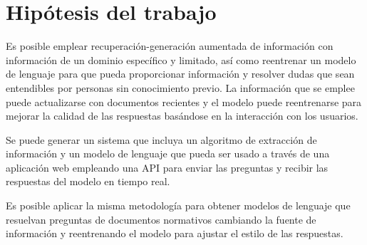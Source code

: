 \section{Hipótesis del trabajo}

Es posible emplear recuperación-generación aumentada de información con información
de un dominio específico y limitado, así como reentrenar un modelo de lenguaje
para que pueda proporcionar información y resolver dudas que sean entendibles
por personas sin conocimiento previo. La información que se emplee puede
actualizarse con documentos recientes y el modelo puede reentrenarse para mejorar
la calidad de las respuestas basándose en la interacción con los usuarios.

Se puede generar un sistema que incluya un algoritmo de extracción de información
y un modelo de lenguaje que pueda ser usado a través de una aplicación web
empleando una API para enviar las preguntas y recibir las respuestas del modelo
en tiempo real.

Es posible aplicar la misma metodología para obtener modelos de lenguaje que
resuelvan preguntas de documentos normativos cambiando la fuente de información
y reentrenando el modelo para ajustar el estilo de las respuestas.
